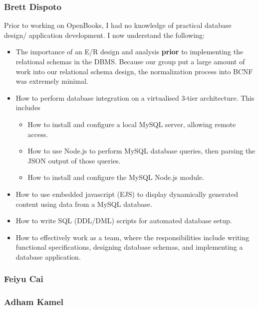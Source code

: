 \documentclass[letter, 12pt, titlepage]{article}
\begin{document}
\subsubsection{Brett Dispoto}
Prior to working on OpenBooks, I had no knowledge of practical database design/ application development. I now understand the following:
\begin{itemize}
	\item The importance of an E/R design and analysis \textbf{prior} to implementing the relational schemas in the DBMS. Because our group put a large amount of work into our relational schema design, the normalization process into BCNF was extremely minimal.
	\item How to perform database integration on a virtualised 3-tier architecture. This includes
	      \begin{itemize}
		      \item How to install and configure a local MySQL server, allowing remote access.
		      \item How to use Node.js to perform MySQL database queries, then parsing the JSON output of those queries.
		      \item How to install and configure the MySQL Node.js module.
	      \end{itemize}
	\item How to use embedded javascript (EJS) to display dynamically generated content using data from a MySQL database.
	\item How to write SQL (DDL/DML) scripts for automated database setup.
	\item How to effectively work as a team, where the responsibilities include writing functional specifications,  designing database schemas, and implementing a database application.
\end{itemize}
\subsubsection{Feiyu Cai}

\subsubsection{Adham Kamel}
\end{document}
